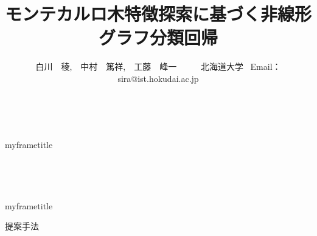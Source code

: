 \documentclass{beamer}           %
\title{\fontsize{62pt}{0pt} \selectfont モンテカルロ木特徴探索に基づく非線形グラフ分類回帰}
\author{\large 白川　稜,　中村　篤祥,　工藤　峰一 ~~~~~北海道大学 
\fontsize{34pt}{0pt} \selectfont~Email：sira@ist.hokudai.ac.jp}
\begin{document}
\fontsize{34pt}{0pt} \selectfont
~ \\
\begin{beamercolorbox}[
    wd=\textwidth,
    sep=0pt,     %
]{myframetitle}
\begin{center}
	\vspace{20pt}
	{\inserttitle} \\
	\vspace{10pt}
	\medskip
	\medskip
	{\insertauthor} \\
	\vspace{20pt}
\end{center}
\end{beamercolorbox}

\vspace{20pt}
\begin{columns}[T]
	\begin{column}{0.50\textwidth}
		
		\vspace{5pt}
		
	\end{column}
	\begin{column}{0.50\textwidth}
		
	\end{column}
\end{columns}

\vspace{3pt}

\vspace{5pt}

\begin{beamercolorbox}[
		wd=1.01\textwidth,
		sep=0pt,     %
	]{myframetitle}
	\begin{center}
		{\large 提案手法} \\
	\end{center}
\end{beamercolorbox}
\vspace{14pt}

\begin{columns}[T]
		\begin{column}{0.50\textwidth}
			
			
		\end{column}
		\begin{column}{0.50\textwidth}
			
		\end{column}
\end{columns}
\end{document}
